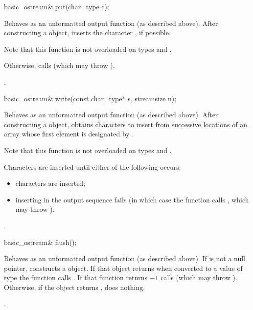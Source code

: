 %
\begin{itemdecl}
basic_ostream& put(char_type c);
\end{itemdecl}

\begin{itemdescr}
\pnum
\effects
Behaves as an unformatted output function (as described above).
After constructing a 
object, inserts
the character , if possible.
\begin{footnote}
Note that this function is not overloaded on types
and
.
\end{footnote}

\pnum
Otherwise, calls
(which may throw
).

\pnum
\returns
{}.
\end{itemdescr}

%
\begin{itemdecl}
basic_ostream& write(const char_type* s, streamsize n);
\end{itemdecl}

\begin{itemdescr}
\pnum
\effects
Behaves as an unformatted output function (as described above).  After constructing a 
object, obtains
characters to insert from
successive locations of an array whose first element is designated by
.
\begin{footnote}
Note that this function is not overloaded on types
and
.
\end{footnote}
Characters are inserted until either of the following occurs:
\begin{itemize}
\item
{} characters are inserted;
\item
inserting in the output sequence fails
(in which case the function calls
,
which may throw
).
\end{itemize}

\pnum
\returns
{}.
\end{itemdescr}

%
\begin{itemdecl}
basic_ostream& flush();
\end{itemdecl}

\begin{itemdescr}
\pnum
\effects
Behaves as an unformatted output function (as described above).
If
is not a null pointer,
constructs a  object. If that object returns  when converted to a value of type  the function
calls
.
If that function returns $-1$
calls
(which may throw
).
Otherwise, if the  object returns , does nothing.

\pnum
\returns
{}.
\end{itemdescr}

